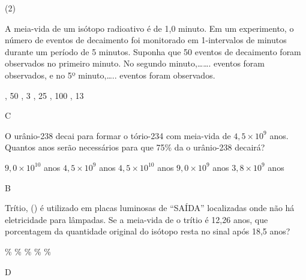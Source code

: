 \documentclass[9 pt]{scrartcl}
\begin{document}
\begin{exercise}[points=1.0]


\begin{choice}(2)

\end{choice}
\end{exercise}
\begin{solution}
\end{solution}



\begin{exercise}
A meia-vida de um isótopo radioativo é de 1,0 minuto. Em um experimento, o número de eventos de decaimento foi monitorado em 1-intervalos de minutos durante um período de 5 minutos. Suponha que 50 eventos de decaimento foram observados no primeiro minuto. No segundo minuto,\ldots{}\ldots{}. eventos foram observados, e no 5º minuto,\ldots{}.. eventos foram observados.
\begin{choice}
, 50 
, 3 
, 25
, 100
, 13
\end{choice}
\end{exercise}
\begin{solution}
C
\end{solution}


\begin{exercise}
O urânio-238 decai para formar o tório-234 com meia-vida de \(4,5 \times 10^9\) anos. Quantos anos serão necessários para que 75\% da o urânio-238 decairá?
\begin{choice}
\choice \(9,0\times 10^{10}\)  anos 
\choice \(4,5 \times 10^9\) anos 
\choice \(4,5 \times 10^{10}\) anos
\choice \(9,0 \times 10^9\) anos
\choice \(3,8 \times 10^9\) anos
\end{choice}
\end{exercise}
\begin{solution}
B
\end{solution}


\begin{exercise}
Trítio, () é utilizado em placas luminosas de “SAÍDA” localizadas onde não há eletricidade para lâmpadas. Se a meia-vida de o trítio é 12,26 anos, que porcentagem da quantidade original do isótopo resta no sinal após 18,5 anos?
\begin{choice}
\% 
\% 
\%
\%
\%
\end{choice}
\end{exercise}
\begin{solution}
D
\end{solution}
\end{document}
